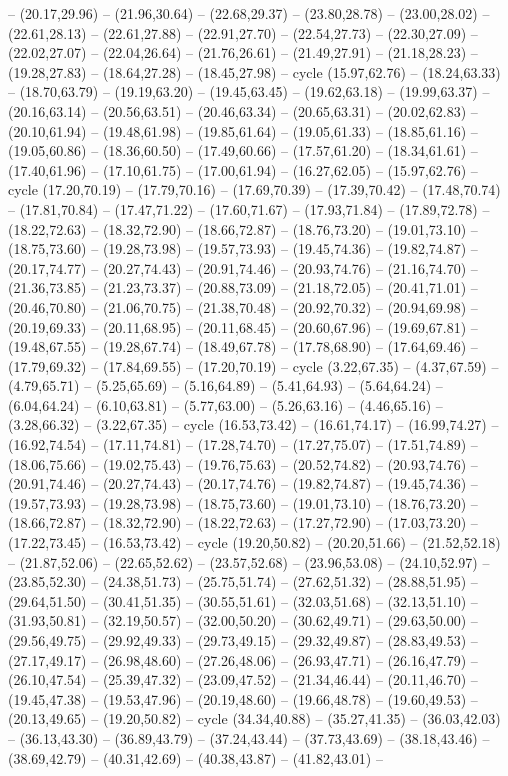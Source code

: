 {-- (20.17,29.96) -- (21.96,30.64) -- (22.68,29.37) -- (23.80,28.78) -- (23.00,28.02) -- (22.61,28.13) -- (22.61,27.88) -- (22.91,27.70) -- (22.54,27.73) -- (22.30,27.09) -- (22.02,27.07) -- (22.04,26.64) -- (21.76,26.61) -- (21.49,27.91) -- (21.18,28.23) -- (19.28,27.83) -- (18.64,27.28) -- (18.45,27.98) -- cycle (15.97,62.76) -- (18.24,63.33) -- (18.70,63.79) -- (19.19,63.20) -- (19.45,63.45) -- (19.62,63.18) -- (19.99,63.37) -- (20.16,63.14) -- (20.56,63.51) -- (20.46,63.34) -- (20.65,63.31) -- (20.02,62.83) -- (20.10,61.94) -- (19.48,61.98) -- (19.85,61.64) -- (19.05,61.33) -- (18.85,61.16) -- (19.05,60.86) -- (18.36,60.50) -- (17.49,60.66) -- (17.57,61.20) -- (18.34,61.61) -- (17.40,61.96) -- (17.10,61.75) -- (17.00,61.94) -- (16.27,62.05) -- (15.97,62.76) -- cycle (17.20,70.19) -- (17.79,70.16) -- (17.69,70.39) -- (17.39,70.42) -- (17.48,70.74) -- (17.81,70.84) -- (17.47,71.22) -- (17.60,71.67) -- (17.93,71.84) -- (17.89,72.78) -- (18.22,72.63) -- (18.32,72.90) -- (18.66,72.87) -- (18.76,73.20) -- (19.01,73.10) -- (18.75,73.60) -- (19.28,73.98) -- (19.57,73.93) -- (19.45,74.36) -- (19.82,74.87) -- (20.17,74.77) -- (20.27,74.43) -- (20.91,74.46) -- (20.93,74.76) -- (21.16,74.70) -- (21.36,73.85) -- (21.23,73.37) -- (20.88,73.09) -- (21.18,72.05) -- (20.41,71.01) -- (20.46,70.80) -- (21.06,70.75) -- (21.38,70.48) -- (20.92,70.32) -- (20.94,69.98) -- (20.19,69.33) -- (20.11,68.95) -- (20.11,68.45) -- (20.60,67.96) -- (19.69,67.81) -- (19.48,67.55) -- (19.28,67.74) -- (18.49,67.78) -- (17.78,68.90) -- (17.64,69.46) -- (17.79,69.32) -- (17.84,69.55) -- (17.20,70.19) -- cycle (3.22,67.35) -- (4.37,67.59) -- (4.79,65.71) -- (5.25,65.69) -- (5.16,64.89) -- (5.41,64.93) -- (5.64,64.24) -- (6.04,64.24) -- (6.10,63.81) -- (5.77,63.00) -- (5.26,63.16) -- (4.46,65.16) -- (3.28,66.32) -- (3.22,67.35) -- cycle (16.53,73.42) -- (16.61,74.17) -- (16.99,74.27) -- (16.92,74.54) -- (17.11,74.81) -- (17.28,74.70) -- (17.27,75.07) -- (17.51,74.89) -- (18.06,75.66) -- (19.02,75.43) -- (19.76,75.63) -- (20.52,74.82) -- (20.93,74.76) -- (20.91,74.46) -- (20.27,74.43) -- (20.17,74.76) -- (19.82,74.87) -- (19.45,74.36) -- (19.57,73.93) -- (19.28,73.98) -- (18.75,73.60) -- (19.01,73.10) -- (18.76,73.20) -- (18.66,72.87) -- (18.32,72.90) -- (18.22,72.63) -- (17.27,72.90) -- (17.03,73.20) -- (17.22,73.45) -- (16.53,73.42) -- cycle (19.20,50.82) -- (20.20,51.66) -- (21.52,52.18) -- (21.87,52.06) -- (22.65,52.62) -- (23.57,52.68) -- (23.96,53.08) -- (24.10,52.97) -- (23.85,52.30) -- (24.38,51.73) -- (25.75,51.74) -- (27.62,51.32) -- (28.88,51.95) -- (29.64,51.50) -- (30.41,51.35) -- (30.55,51.61) -- (32.03,51.68) -- (32.13,51.10) -- (31.93,50.81) -- (32.19,50.57) -- (32.00,50.20) -- (30.62,49.71) -- (29.63,50.00) -- (29.56,49.75) -- (29.92,49.33) -- (29.73,49.15) -- (29.32,49.87) -- (28.83,49.53) -- (27.17,49.17) -- (26.98,48.60) -- (27.26,48.06) -- (26.93,47.71) -- (26.16,47.79) -- (26.10,47.54) -- (25.39,47.32) -- (23.09,47.52) -- (21.34,46.44) -- (20.11,46.70) -- (19.45,47.38) -- (19.53,47.96) -- (20.19,48.60) -- (19.66,48.78) -- (19.60,49.53) -- (20.13,49.65) -- (19.20,50.82) -- cycle (34.34,40.88) -- (35.27,41.35) -- (36.03,42.03) -- (36.13,43.30) -- (36.89,43.79) -- (37.24,43.44) -- (37.73,43.69) -- (38.18,43.46) -- (38.69,42.79) -- (40.31,42.69) -- (40.38,43.87) -- (41.82,43.01) -- }
